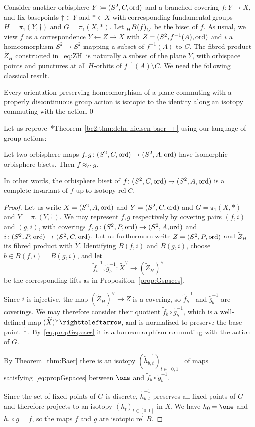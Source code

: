 \documentclass{amsart}
\newcommand\wtf{{\widetilde f}}
\newcommand\wtg{{\widetilde g}}
\begin{document}
Consider another orbisphere $Y\coloneqq(S^2,C,\operatorname{ord})$ and a branched
covering $f\colon Y\to X$, and fix basepoints $\dagger\in Y$ and
$*\in X$ with corresponding fundamental groups $H=\pi_1(Y,\dagger)$
and $G=\pi_1(X,*)$. Let $\subscript H{B(f)}_G$ be the biset of $f$. As
usual, we view $f$ as a correspondence $Y\leftarrow Z\to X$ with
$Z=(S^2,f^{-1}(A),\operatorname{ord})$ and $i$ a homeomorphism $S^2\to S^2$ mapping
a subset of $f^{-1}(A)$ to $C$. The fibred product $\widetilde Z_H$
constructed in~\eqref{eq:ZH} is naturally a subset of the plane
$\widetilde Y$, with orbispace points and punctures at all $H$-orbits
of $f^{-1}(A)\setminus C$.  We need the following classical result.
\begin{thm}\label{thm:Baer}
  Every orientation-preserving homeomorphism of a plane commuting with
  a properly discontinuous group action is isotopic to the identity
  along an isotopy commuting with the action.\qed
\end{thm}

\noindent Let us
reprove~\cite{bartholdi-dudko:bc2}*{Theorem~\ref{bc2:thm:dehn-nielsen-baer++}}
using our language of group actions:
\begin{cor}\label{cor:OrbiIsComplInvar}
  Let two orbisphere maps $f,g\colon (S^2,C,\operatorname{ord})\to (S^2,A,\operatorname{ord})$
  have isomorphic orbisphere bisets. Then $f\approx_C g$.

  In other words, the orbisphere biset of
  $f\colon(S^2,C,\operatorname{ord})\to(S^2,A,\operatorname{ord})$ is a complete invariant of $f$
  up to isotopy rel $C$.
\end{cor}
\begin{proof}
  Let us write $X=(S^2,A,\operatorname{ord})$ and $Y=(S^2,C,\operatorname{ord})$ and
  $G=\pi_1(X,*)$ and $Y=\pi_1(Y,\dagger)$. We may represent $f,g$
  respectively by covering pairs $(f,i)$ and $(g,i)$, with coverings
  $f,g\colon(S^2,P,\operatorname{ord})\to(S^2,A,\operatorname{ord})$ and
  $i\colon(S^2,P,\operatorname{ord})\to(S^2,C,\operatorname{ord})$. Let us furthermore write
  $Z=(S^2,P,\operatorname{ord})$ and $\widetilde Z_H$ its fibred product with
  $\widetilde Y$. Identifying $B(f,i)$ and $B(g,i)$, choose
  $b\in B(f,i)=B(g,i)$, and let
  \[\wtf^{-1}_b,\wtg^{-1}_b\colon \widetilde X^\vee\to(\widetilde Z_H)^\vee
  \]
  be the corresponding lifts as in Proposition~\ref{prop:Gspaces}.

  Since $i$ is injective, the map $(\widetilde Z_H)^\vee\to Z$ is a
  covering, so $\wtf^{-1}_b$ and $\wtg^{-1}_b$ are
  coverings. We may therefore consider their quotient
  $\wtf_b\circ \wtg^{-1}_b$, which is a well-defined
  map $(\widetilde X)^\vee\selfmap$, and is normalized to preserve the
  base point $\widetilde *$. By~\eqref{eq:propGspaces} it is a
  homeomorphism commuting with the action of $G$.

  By Theorem~\ref{thm:Baer} there is an isotopy
  $(\widetilde h_{b,t}^{-1})_{t\in[0,1]}$ of maps
  satisfying~\eqref{eq:propGspaces} between $\one$ and
  $\wtf_b\circ \wtg^{-1}_b$.

  Since the set of fixed points of $G$ is discrete,
  $\widetilde h_{b,t}^{-1}$ preserves all fixed points of $G$ and
  therefore projects to an isotopy $(h_t)_{t\in[0,1]}$ in $X$. We have
  $h_0=\one$ and $h_1\circ g=f$, so the maps $f$ and $g$ are isotopic
  rel $B$.
\end{proof}
\end{document}
